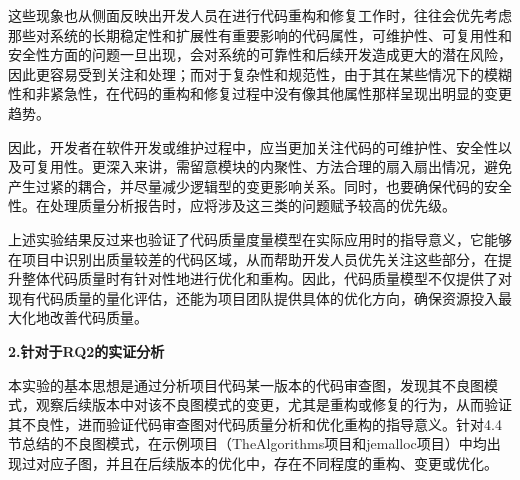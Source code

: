这些现象也从侧面反映出开发人员在进行代码重构和修复工作时，往往会优先考虑那些对系统的长期稳定性和扩展性有重要影响的代码属性，可维护性、可复用性和安全性方面的问题一旦出现，会对系统的可靠性和后续开发造成更大的潜在风险，因此更容易受到关注和处理；而对于复杂性和规范性，由于其在某些情况下的模糊性和非紧急性，在代码的重构和修复过程中没有像其他属性那样呈现出明显的变更趋势。

因此，开发者在软件开发或维护过程中，应当更加关注代码的可维护性、安全性以及可复用性。更深入来讲，需留意模块的内聚性、方法合理的扇入扇出情况，避免产生过紧的耦合，并尽量减少逻辑型的变更影响关系。同时，也要确保代码的安全性。在处理质量分析报告时，应将涉及这三类的问题赋予较高的优先级。

上述实验结果反过来也验证了代码质量度量模型在实际应用时的指导意义，它能够在项目中识别出质量较差的代码区域，从而帮助开发人员优先关注这些部分，在提升整体代码质量时有针对性地进行优化和重构。因此，代码质量模型不仅提供了对现有代码质量的量化评估，还能为项目团队提供具体的优化方向，确保资源投入最大化地改善代码质量。

\textbf{2.针对于RQ2的实证分析}

本实验的基本思想是通过分析项目代码某一版本的代码审查图，发现其不良图模式，观察后续版本中对该不良图模式的变更，尤其是重构或修复的行为，从而验证其不良性，进而验证代码审查图对代码质量分析和优化重构的指导意义。针对4.4节总结的不良图模式，在示例项目（TheAlgorithms项目和jemalloc项目）中均出现过对应子图，并且在后续版本的优化中，存在不同程度的重构、变更或优化。

